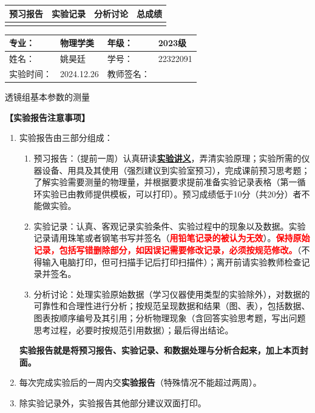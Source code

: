\documentclass[dvipsnames, svgnames,a4paper,11pt]{article}
\begin{document}
\begin{table}
	\renewcommand\arraystretch{1.7}
	\begin{tabularx}{\textwidth}{
		|X|X|X|X
		|X|X|X|X|}
	\hline
	\multicolumn{2}{|c|}{预习报告}&\multicolumn{2}{|c|}{实验记录}&\multicolumn{2}{|c|}{分析讨论}&\multicolumn{2}{|c|}{总成绩}\\
	\hline
	 & &  & &  & &  & \\
	\hline
	\end{tabularx}
\end{table}


\begin{table}
	\renewcommand\arraystretch{1.7}
	\begin{tabularx}{\textwidth}{|X|X|X|X|}
	\hline
	专业：& 物理学类 &年级：& 2023级\\
	\hline
	姓名：& 姚昊廷  & 学号：&22322091\\
	\hline
	实验时间：& 2024.12.26& 教师签名：& \\
	\hline
	\end{tabularx}
\end{table}

\begin{center}
	\LARGE 透镜组基本参数的测量
\end{center}

\textbf{【实验报告注意事项】}
\begin{enumerate}
	\item 实验报告由三部分组成：
	\begin{enumerate}
		\item 预习报告：（提前一周）认真研读\underline{\textbf{实验讲义}}，弄清实验原理；实验所需的仪器设备、用具及其使用（强烈建议到实验室预习），完成课前预习思考题；了解实验需要测量的物理量，并根据要求提前准备实验记录表格（第一循环实验已由教师提供模板，可以打印）。预习成绩低于10分（共20分）者不能做实验。
	    \item 实验记录：认真、客观记录实验条件、实验过程中的现象以及数据。实验记录请用珠笔或者钢笔书写并签名（\textcolor{red}{\textbf{用铅笔记录的被认为无效}}）。\textcolor{red}{\textbf{保持原始记录，包括写错删除部分，如因误记需要修改记录，必须按规范修改。}}（不得输入电脑打印，但可扫描手记后打印扫描件）；离开前请实验教师检查记录并签名。
	    \item 分析讨论：处理实验原始数据（学习仪器使用类型的实验除外），对数据的可靠性和合理性进行分析；按规范呈现数据和结果（图、表），包括数据、图表按顺序编号及其引用；分析物理现象（含回答实验思考题，写出问题思考过程，必要时按规范引用数据）；最后得出结论。
	\end{enumerate}
	\textbf{实验报告就是将预习报告、实验记录、和数据处理与分析合起来，加上本页封面。}
	\item 每次完成实验后的一周内交\textbf{实验报告}（特殊情况不能超过两周）。
	\item 除实验记录外，实验报告其他部分建议双面打印。
\end{enumerate}
\end{document}
